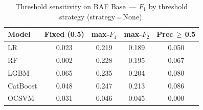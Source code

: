 \begin{table}[ht]
\centering
\caption{Threshold sensitivity on BAF Base~--- $F_1$ by threshold strategy (strategy\,=\,None).}
\label{tab:threshold_baf_f1}
\begin{tabular}{l c c c c}
\toprule
Model & Fixed (0.5) & max-$F_1$ & max-$F_2$ & Prec\,$\geq$\,0.5 \\
\midrule
LR         & 0.023 & 0.219 & 0.189 & 0.050 \\
RF         & 0.002 & 0.228 & 0.195 & 0.067 \\
LGBM       & 0.065 & 0.235 & 0.204 & 0.080 \\
CatBoost   & 0.048 & 0.247 & 0.213 & 0.086 \\
OCSVM      & 0.031 & 0.046 & 0.045 & 0.000 \\
\bottomrule
\end{tabular}
\end{table}
